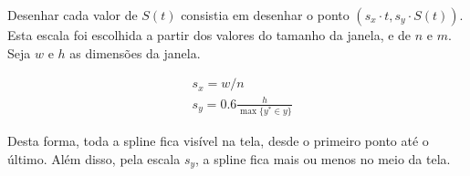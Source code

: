 \documentclass[12pt]{article}
\theoremstyle{plain}
\numberwithin{equation}{section}
\begin{document}
Desenhar cada valor de $S(t)$ consistia em desenhar o ponto $(s_x\cdot t, s_y\cdot S(t))$. Esta
escala foi escolhida a partir dos valores do tamanho da janela, e de $n$ e $m$. Seja $w$ e $h$ as
dimensões da janela.

\begin{align*}
  &s_x = w/n\\
  &s_y = 0.6\frac{h}{\max\{y^\ast\in y\}}
\end{align*}

Desta forma, toda a spline fica visível na tela, desde o primeiro ponto até o último. Além disso,
pela escala $s_y$, a spline fica mais ou menos no meio da tela.

\printbibliography[]
\end{document}
